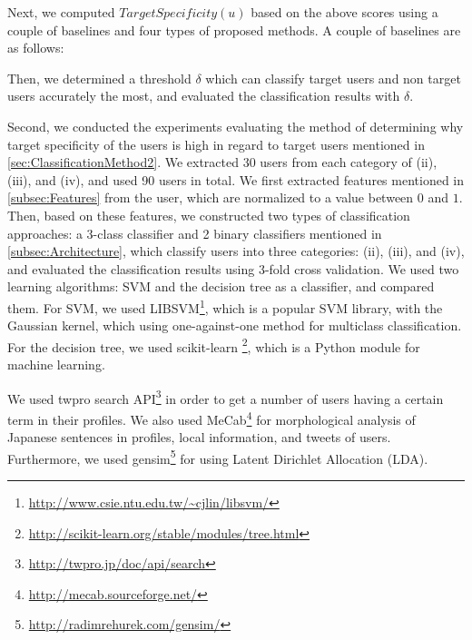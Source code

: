 Next, we computed $\mathit{TargetSpecificity}(u)$
based on the above scores using a couple of baselines and four types of
proposed methods.  A couple of baselines are as follows:




Then, we
determined a threshold $\delta$ which can classify target users and
non target users accurately the most, and evaluated the classification
results with $\delta$.

Second, we conducted the experiments evaluating the method of determining
why target specificity of the users is high in regard to target
users mentioned in \ref{sec:ClassificationMethod2}.  We extracted 30 users
from each category of (ii), (iii), and (iv), and used 90 users
in total.  We first extracted features mentioned in
\ref{subsec:Features} from the user, which are normalized to a
value between $0$ and $1$.  Then, based on these features, we
constructed two types of classification approaches: a 3-class
classifier and
2 binary classifiers mentioned in \ref{subsec:Architecture}, which
classify users into three categories:
(ii), (iii), and (iv), and evaluated the classification results using
3-fold cross validation.  We used two learning algorithms: SVM and the
decision tree as a classifier, and compared them.  For SVM, we used
LIBSVM\footnote{\url{http://www.csie.ntu.edu.tw/~cjlin/libsvm/}}, which
is a popular SVM library, with the Gaussian kernel, which using
one-against-one method for multiclass classification.  For the decision
tree, we used scikit-learn
\footnote{\url{http://scikit-learn.org/stable/modules/tree.html}}, which
is a Python module for machine learning.

We used twpro search API\footnote{\url{http://twpro.jp/doc/api/search}}
in order to get a number of users having a certain term in their
profiles.  We also used
MeCab\footnote{\url{http://mecab.sourceforge.net/}} for morphological
analysis of Japanese sentences in profiles, local information, and
tweets of users.  Furthermore, we used
gensim\footnote{\url{http://radimrehurek.com/gensim/}} for using Latent
Dirichlet Allocation (LDA).


